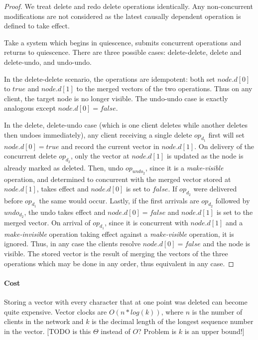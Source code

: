 \documentclass[12pt,a4paper,twoside,openright]{report}
\begin{document}
			\begin{proof}
				We treat delete and redo delete operations identically. Any non-concurrent modifications are not considered as the latest causally dependent operation is defined to take effect.
				
				Take a system which begins in quiescence, submits concurrent operations and returns to quiescence. There are three possible cases: delete-delete, delete and delete-undo, and undo-undo.
				
				In the delete-delete scenario, the operations are idempotent: both set $node.d[0]$ to $true$ and $node.d[1]$ to the merged vectors of the two operations. Thus on any client, the target node is no longer visible. The undo-undo case is exactly analogous except $node.d[0] = false$. 
				
				In the delete, delete-undo case (which is one client deletes while another deletes then undoes immediately), any client receiving a single delete $op_{d_1}$ first will set $node.d[0] = true$ and record the current vector in $node.d[1]$. On delivery of the concurrent delete $op_{d_2}$, only the vector at $node.d[1]$ is updated as the node is already marked as deleted. Then, undo $op_{undo_2}$, since it is a \textit{make-visible} operation, and determined to concurrent with the merged vector stored at $node.d[1]$, takes effect and $node.d[0]$ is set to $false$. If $op_{d_2}$ were delivered before $op_{d_1}$ the same would occur. Lastly, if the first arrivals are $op_{d_2}$ followed by $undo_{d_2}$, the undo takes effect and $node.d[0] = false$ and $node.d[1]$ is set to the merged vector. On arrival of $op_{d_1}$, since it is concurrent with $node.d[1]$ and a \textit{make-invisible} operation taking effect against a \textit{make-visible} operation, it is ignored. Thus, in any case the clients resolve $node.d[0] = false$ and the node is visible. The stored vector is the result of merging the vectors of the three operations which may be done in any order, thus equivalent in any case.
				
			\end{proof}
			
			\paragraph{Cost}
			Storing a vector with every character that at one point was deleted can become quite expensive. Vector clocks are $O(n*log(k))$, where $n$ is the number of clients in the network and $k$ is the decimal length of the longest sequence number in the vector.
			[TODO is this $\Theta$ instead of $O$? Problem is $k$ is an upper bound!]
			
\end{document}
